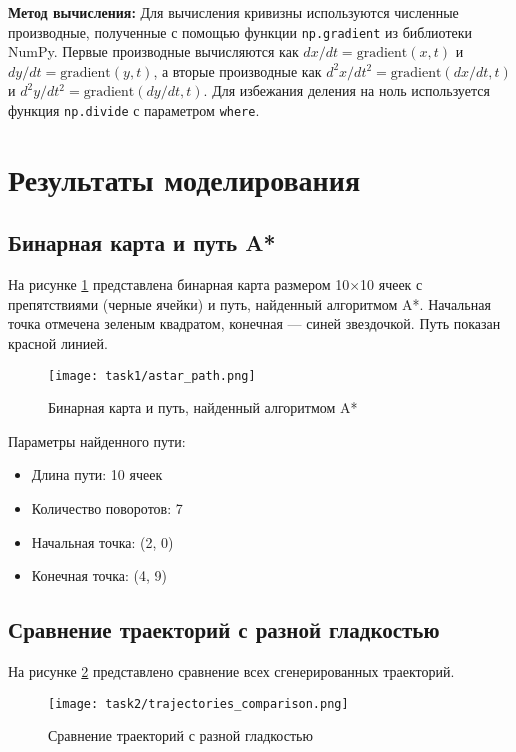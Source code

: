\textbf{Метод вычисления:} Для вычисления кривизны используются численные производные, полученные с помощью функции \texttt{np.gradient} из библиотеки NumPy. Первые производные вычисляются как $dx/dt = \text{gradient}(x, t)$ и $dy/dt = \text{gradient}(y, t)$, а вторые производные как $d^2x/dt^2 = \text{gradient}(dx/dt, t)$ и $d^2y/dt^2 = \text{gradient}(dy/dt, t)$. Для избежания деления на ноль используется функция \texttt{np.divide} с параметром \texttt{where}.

\section{Результаты моделирования}

\subsection{Бинарная карта и путь A*}

На рисунке \ref{fig:astar_path} представлена бинарная карта размером 10×10 ячеек с препятствиями (черные ячейки) и путь, найденный алгоритмом A*. Начальная точка отмечена зеленым квадратом, конечная --- синей звездочкой. Путь показан красной линией.

\begin{figure}[H]
\centering
\texttt{[image: task1/astar\_path.png]}
\caption{Бинарная карта и путь, найденный алгоритмом A*}
\label{fig:astar_path}
\end{figure}

Параметры найденного пути:
\begin{itemize}
\item Длина пути: 10 ячеек
\item Количество поворотов: 7
\item Начальная точка: (2, 0)
\item Конечная точка: (4, 9)
\end{itemize}

\subsection{Сравнение траекторий с разной гладкостью}

На рисунке \ref{fig:trajectories_comparison} представлено сравнение всех сгенерированных траекторий.

\begin{figure}[H]
\centering
\texttt{[image: task2/trajectories\_comparison.png]}
\caption{Сравнение траекторий с разной гладкостью}
\label{fig:trajectories_comparison}
\end{figure}

